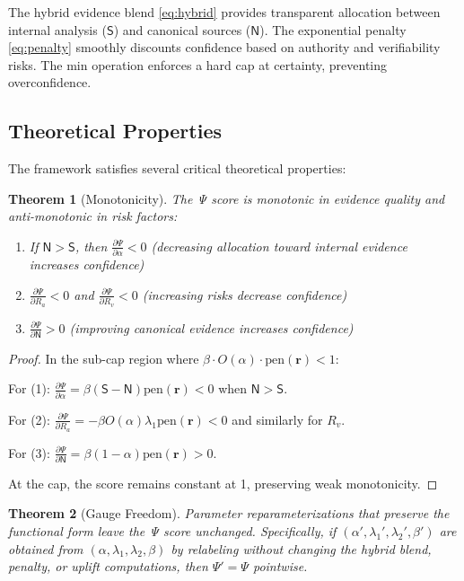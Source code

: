 \documentclass[12pt,a4paper]{article}
\newtheorem{theorem}{Theorem}
\newcommand{\Ssig}{\mathsf{S}}
\newcommand{\Nsig}{\mathsf{N}}
\newcommand{\alloc}{\alpha}
\newcommand{\riskvec}{\mathbf{r}}
\newcommand{\rA}{R_a}
\newcommand{\rV}{R_v}
\newcommand{\lA}{\lambda_1}
\newcommand{\lV}{\lambda_2}
\newcommand{\uplift}{\beta}
\newcommand{\pen}{\mathrm{pen}}
\newcommand{\blend}{O}
\newcommand{\score}{\Psi}
\begin{document}
The hybrid evidence blend \eqref{eq:hybrid} provides transparent allocation between internal analysis ($\Ssig$) and canonical sources ($\Nsig$). The exponential penalty \eqref{eq:penalty} smoothly discounts confidence based on authority and verifiability risks. The min operation enforces a hard cap at certainty, preventing overconfidence.

\subsection{Theoretical Properties}

The framework satisfies several critical theoretical properties:

\begin{theorem}[Monotonicity]
The Ψ score is monotonic in evidence quality and anti-monotonic in risk factors:
\begin{enumerate}
\item If $\Nsig > \Ssig$, then $\frac{\partial \score}{\partial \alloc} < 0$ (decreasing allocation toward internal evidence increases confidence)
\item $\frac{\partial \score}{\partial \rA} < 0$ and $\frac{\partial \score}{\partial \rV} < 0$ (increasing risks decrease confidence)
\item $\frac{\partial \score}{\partial \Nsig} > 0$ (improving canonical evidence increases confidence)
\end{enumerate}
\end{theorem}

\begin{proof}
In the sub-cap region where $\uplift \cdot \blend(\alloc) \cdot \pen(\riskvec) < 1$:

For (1): $\frac{\partial \score}{\partial \alloc} = \uplift (\Ssig - \Nsig) \pen(\riskvec) < 0$ when $\Nsig > \Ssig$.

For (2): $\frac{\partial \score}{\partial \rA} = -\uplift \blend(\alloc) \lA \pen(\riskvec) < 0$ and similarly for $\rV$.

For (3): $\frac{\partial \score}{\partial \Nsig} = \uplift (1-\alloc) \pen(\riskvec) > 0$.

At the cap, the score remains constant at 1, preserving weak monotonicity.
\end{proof}

\begin{theorem}[Gauge Freedom]
\label{thm:gauge-freedom}
Parameter reparameterizations that preserve the functional form leave the Ψ score unchanged. Specifically, if $(\alloc', \lA', \lV', \uplift')$ are obtained from $(\alloc, \lA, \lV, \uplift)$ by relabeling without changing the hybrid blend, penalty, or uplift computations, then $\score' = \score$ pointwise.
\end{theorem}
\end{document}
